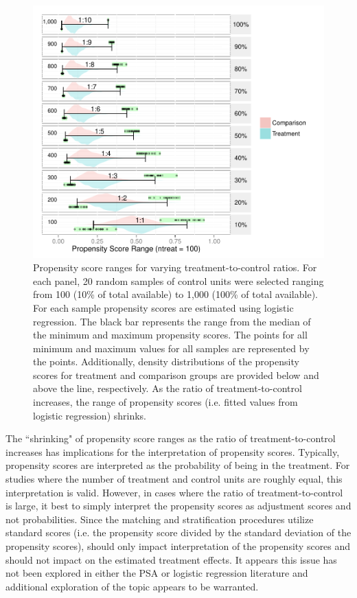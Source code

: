 \documentclass[letterpaper,12p,twoside]{article} %
\begin{document}
\setlength{\belowcaptionskip}{-20pt}
\begin{figure}[t!]
\begin{center}
\includegraphics[width=\textwidth,trim=0 0 0 .2in]{../Figures2009/PSRanges.pdf}
\caption[Propensity score ranges for varying treatment-to-control ratios]{Propensity score ranges for varying treatment-to-control ratios. For each panel, 20 random samples of control units were selected ranging from 100 (10\% of total available) to 1,000 (100\% of total available). For each sample propensity scores are estimated using logistic regression. The black bar represents the range from the median of the minimum and maximum propensity scores. The points for all minimum and maximum values for all samples are represented by the points. Additionally, density distributions of the propensity scores for treatment and comparison groups are provided below and above the line, respectively. As the ratio of treatment-to-control increases, the range of propensity scores (i.e. fitted values from logistic regression) shrinks.}
\label{fig:psranges}
\end{center}
\end{figure}
\setlength{\belowcaptionskip}{0pt}


The ``shrinking" of propensity score ranges as the ratio of treatment-to-control increases has implications for the interpretation of propensity scores. Typically, propensity scores are interpreted as the probability of being in the treatment. For studies where the number of treatment and control units are roughly equal, this interpretation is valid. However, in cases where the ratio of treatment-to-control is large, it best to simply interpret the propensity scores as adjustment scores and not probabilities. Since the matching and stratification procedures utilize standard scores (i.e. the propensity score divided by the standard deviation of the propensity scores), should only impact interpretation of the propensity scores and should not impact on the estimated treatment effects. It appears this issue has not been explored in either the PSA or logistic regression literature and additional exploration of the topic appears to be warranted.
\end{document}
